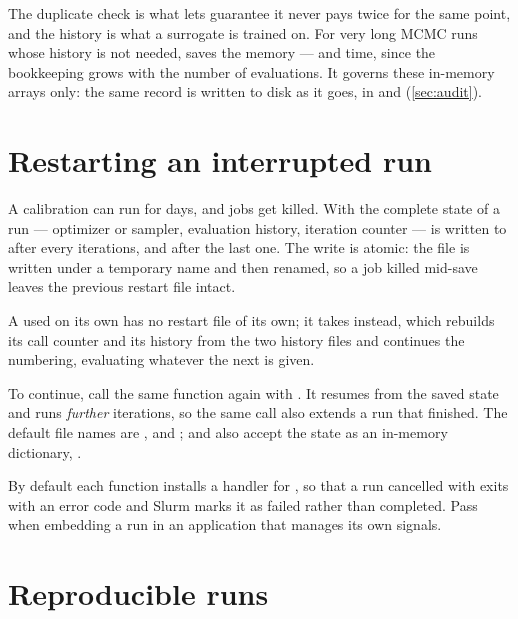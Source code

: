 The duplicate check is what lets  guarantee it never pays twice for the same
point, and the history is what a surrogate is trained on. For very long MCMC runs whose history is
not needed,  saves the memory --- and time, since the bookkeeping grows
with the number of evaluations. It governs these in-memory arrays only: the same record is written
to disk as it goes, in  and  (\cref{sec:audit}).

\section{Restarting an interrupted run}
\label{sec:restart}

A calibration can run for days, and jobs get killed. With  the complete
state of a run --- optimizer or sampler, evaluation history, iteration counter --- is written to
 after every  iterations, and after the last one. The write is
atomic: the file is written under a temporary name and then renamed, so a job killed mid-save
leaves the previous restart file intact.

A  used on its own has no restart file of its own; it takes 
instead, which rebuilds its call counter and its history from the two history files and continues
the numbering, evaluating whatever the next  is given.

To continue, call the same function again with . It resumes from the saved
state and runs  \emph{further} iterations, so the same call also extends a run that
finished. The default file names are ,  and
;  and  also accept the state as
an in-memory dictionary, .

By default each function installs a handler for , so that a run cancelled with
 exits with an error code and Slurm marks it as failed rather than completed. Pass
 when embedding a run in an application that manages its own
signals.

\section{Reproducible runs}
\label{sec:seed}

